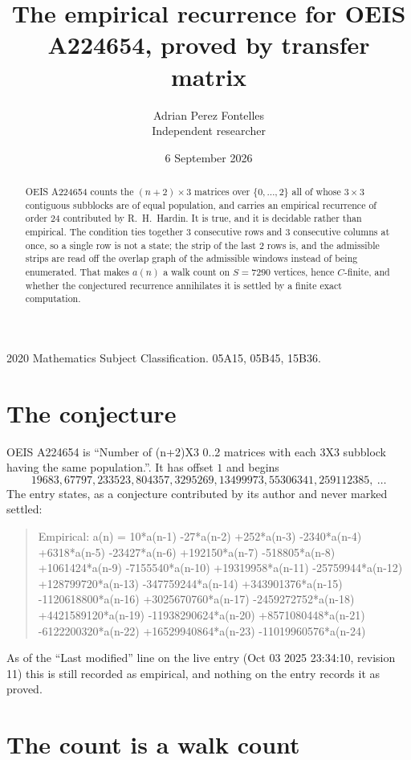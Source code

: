 \documentclass[11pt,a4paper]{article}
\title{The empirical recurrence for OEIS A224654, proved by transfer matrix}
\author{Adrian Perez Fontelles\\ \small Independent researcher}
\date{6 September 2026}
\theoremstyle{plain}
\theoremstyle{definition}
\begin{document}
\maketitle

\begin{abstract}
OEIS A224654 counts the $(n+2)\times3$ matrices over $\{0,\dots,2\}$ all of whose
$3\times3$ contiguous subblocks are of equal population, and carries an empirical recurrence of order
$24$ contributed by R.~H.~Hardin. It is true, and it is decidable rather than empirical.
The condition ties together $3$ consecutive rows and $3$ consecutive columns at once, so a
single row is not a state; the strip of the last $2$ rows is, and the admissible strips
are read off the overlap graph of the admissible windows instead of being enumerated. That
makes $a(n)$ a walk count on $S=7290$ vertices, hence $C$-finite, and whether the conjectured
recurrence annihilates it is settled by a finite exact computation.
\end{abstract}

\noindent\small 2020 Mathematics Subject Classification. 05A15, 05B45, 15B36.\normalsize

\section{The conjecture}

OEIS A224654 is ``Number of (n+2)X3 0..2 matrices with each 3X3 subblock having the same population.''. It has offset $1$ and begins
\[
19683, 67797, 233523, 804357, 3295269, 13499973, 55306341, 259112385,\ \dots
\]
The entry states, as a conjecture contributed by its author and never marked settled:
\begin{quote}
Empirical: a(n) = 10*a(n-1) -27*a(n-2) +252*a(n-3) -2340*a(n-4) +6318*a(n-5) -23427*a(n-6) +192150*a(n-7) -518805*a(n-8) +1061424*a(n-9) -7155540*a(n-10) +19319958*a(n-11) -25759944*a(n-12) +128799720*a(n-13) -347759244*a(n-14) +343901376*a(n-15) -1120618800*a(n-16) +3025670760*a(n-17) -2459272752*a(n-18) +4421589120*a(n-19) -11938290624*a(n-20) +8571080448*a(n-21) -6122200320*a(n-22) +16529940864*a(n-23) -11019960576*a(n-24)
\end{quote}
As of the ``Last modified'' line on the live entry (Oct 03 2025 23:34:10, revision 11) this is still
recorded as empirical, and nothing on the entry records it as proved.

\section{The count is a walk count}
\end{document}
